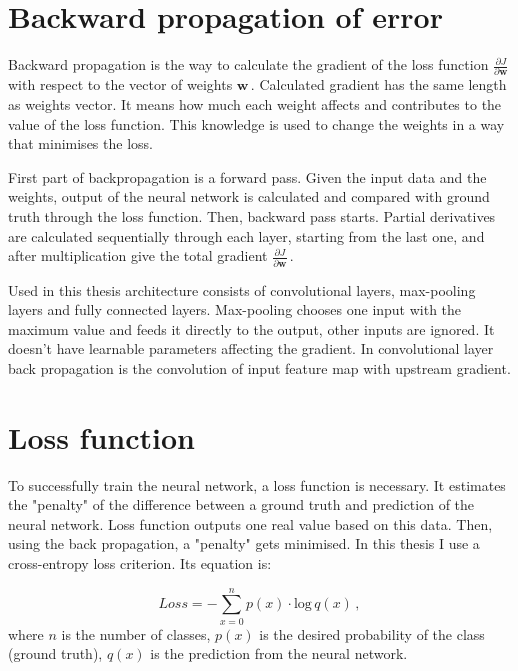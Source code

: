 \section{Backward propagation of error}
\label{backprop}

Backward propagation is the way to calculate the gradient of the loss function $\frac{\partial J}{\partial \textbf{w}}$ with respect to the vector of weights $\textbf{w}$\,. Calculated gradient has the same length as weights vector. It means how much each weight affects and contributes to the value of the loss function. This knowledge is used to change the weights in a way that minimises the loss. 

First part of backpropagation is a forward pass. Given the input data and the weights, output of the neural network is calculated and compared with ground truth through the loss function. Then, backward pass starts. Partial derivatives are calculated sequentially through each layer, starting from the last one, and after multiplication give the total gradient $\frac{\partial J}{\partial \textbf{w}}$\,.

Used in this thesis architecture consists of convolutional layers, max-pooling layers and fully connected layers. Max-pooling chooses one input with the maximum value and feeds it directly to the output, other inputs are ignored. It doesn't have learnable parameters affecting the gradient. In convolutional layer back propagation is the convolution of input feature map with upstream gradient. 



\section{Loss function}

To successfully train the neural network, a loss function is necessary. It estimates the "penalty" of the difference between a ground truth and prediction of the neural network. Loss function outputs one real value based on this data. Then, using the back propagation, a "penalty" gets minimised. In this thesis I use a cross-entropy loss criterion. Its equation is:

\begin{equation}
	Loss = -\sum\limits_{x=0}^n p(x)\cdot \textrm{log} \,q(x) \,,
\end{equation}
where $n$ is the number of classes, $p(x)$ is the desired probability of the class (ground truth), $q(x)$ is the prediction from the neural network.




